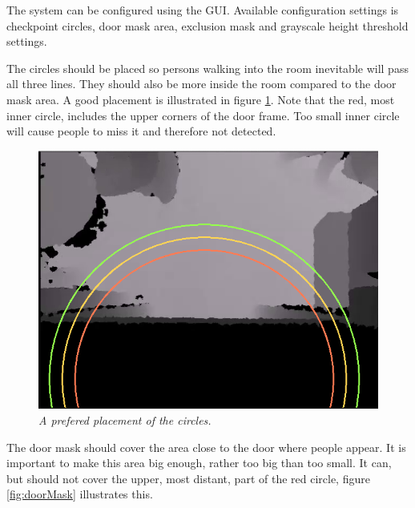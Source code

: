 The system can be configured using the GUI. Available configuration settings is checkpoint circles, door mask area, exclusion mask and grayscale height threshold settings. 

The circles should be placed so persons walking into the room inevitable will pass all three lines. They should also be more inside the room compared to the door mask area. A good placement is illustrated in figure \ref{fig:circlePlacement}. Note that the red, most inner circle, includes the upper corners of the door frame. Too small inner circle will cause people to miss it and therefore not detected. 

\begin{figure}[H]
	\centering
	\includegraphics[width=\linewidth]{images/Manual2.png}
	\caption[Circle placment]{\textit{A prefered placement of the circles. }}
	\label{fig:circlePlacement}  %
\end{figure}

\newpage
The door mask should cover the area close to the door where people appear. It is important to make this area big enough, rather too big than too small. It can, but should not cover the upper, most distant, part of the red circle, figure \ref{fig:doorMask} illustrates this.

